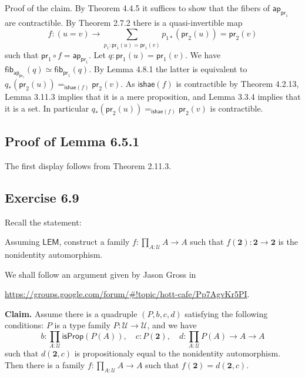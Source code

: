 \documentclass[12pt]{article}
\newcommand{\mbf}{\mathbf}
\newcommand{\msf}{\mathsf}
\newcommand{\nn}{\noindent}
\newcommand{\pr}{\mathsf{pr}}
\newcommand{\U}{\mathcal U}
\begin{document}
\nn Proof of the claim. By Theorem 4.4.5 it suffices to show that the fibers of $\msf{ap}_{\pr_1}$ are contractible. By Theorem 2.7.2 there is a quasi-invertible map 
$$
f:(u=v)\to\sum_{p_1:\pr_1(u)=\pr_1(v)}p_{1*}(\pr_2(u))=\pr_2(v)
$$ 
such that $\pr_1\circ f=\msf{ap}_{\pr_1}$. Let $q:\pr_1(u)=\pr_1(v)$. We have $\msf{fib}_{\msf{ap}_{\pr_1}}(q)\simeq\msf{fib}_{\pr_1}(q)$. By Lemma 4.8.1 the latter is equivalent to $q_*(\pr_2(u))=_{\msf{ishae}(f)}\pr_2(v)$. As $\msf{ishae}(f)$ is contractible by Theorem 4.2.13, Lemma 3.11.3 implies that it is a mere proposition, and Lemma 3.3.4 implies that it is a set. In particular $q_*(\pr_2(u))=_{\msf{ishae}(f)}\pr_2(v)$ is contractible.


\subsection{Proof of Lemma 6.5.1}

The first display follows from Theorem 2.11.3.


\subsection{Exercise 6.9}

Recall the statement:

Assuming $\msf{LEM}$, construct a family $f:\prod_{A:\U}A\to A$ such that $f(\mbf2):\mbf2\to\mbf2$ is the nonidentity automorphism.


We shall follow an argument given by Jason Gross in 

\nn\href{https://groups.google.com/forum/#!topic/hott-cafe/Pp7AgvKr5PI}{https://groups.google.com/forum/\#!topic/hott-cafe/Pp7AgvKr5PI}.


\nn\textbf{Claim.} Assume there is a quadruple $(P,b,c,d)$ satisfying the following conditions: $P$ is a type family $P:\U\to\U$, and we have
$$
b:\prod_{A:\U}\msf{isProp}(P(A)),\quad c:P(\mbf2),\quad d:\prod_{A:\U}P(A)\to A\to A
$$ 
such that $d(\mbf2,c)$ is propositionaly equal to the nonidentity automorphism. Then there is a family $f:\prod_{A:\U}A\to A$ such that $f(\mbf2)=d(\mbf2,c)$. %
\end{document}

